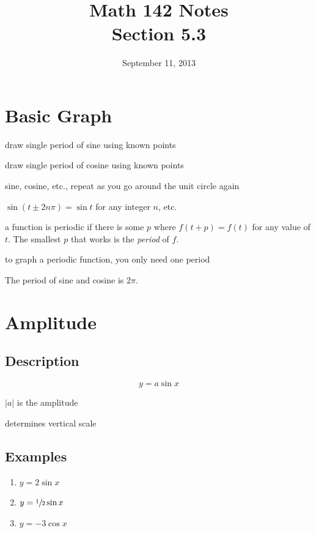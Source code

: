 \documentclass{exam}
\title{Math 142 Notes \\ Section 5.3}
\date{September 11, 2013}
\begin{document}
  \maketitle
  \tableofcontents

  \section{Basic Graph}

  \begin{itemize*}
    \item draw single period of sine using known points
    \item draw single period of cosine using known points
  \end{itemize*}

  \begin{itemize*}
    \item sine, cosine, etc., repeat as you go around the unit circle again
    \item $\sin(t \pm 2n \pi) = \sin t$ for any integer $n$, etc.
    \item a function is periodic if there is some $p$ where $f(t + p) = f(t)$ for any value of $t$.  The smallest
      $p$ that works is the {\em period} of $f$.
    \item to graph a periodic function, you only need one period
    \item The period of sine and cosine is $2 \pi$.  
  \end{itemize*}

  \section{Amplitude}
  \subsection{Description}
  \[
    y = a \sin x
  \]

  \begin{itemize*}
    \item $|a|$ is the amplitude
    \item determines vertical scale
  \end{itemize*}

  \subsection{Examples}
  \begin{enumerate}
    \item $y = 2 \sin x$
    \item $y = \sfrac{1}{2} \sin x$
    \item $y = -3 \cos x$
  \end{enumerate}
\end{document}
